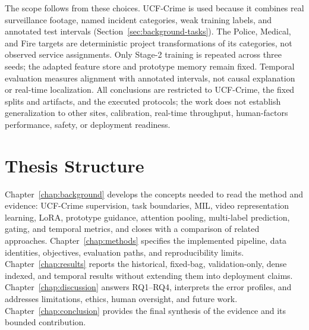 The scope follows from these choices. UCF-Crime is used because it combines
real surveillance footage, named incident categories, weak training labels, and
annotated test intervals (Section~\ref{sec:background-tasks}). The Police,
Medical, and Fire targets are deterministic project transformations of its
categories, not observed service assignments. Only Stage-2 training is repeated
across three seeds; the adapted feature store and prototype memory remain fixed.
Temporal evaluation measures alignment with annotated intervals, not causal
explanation or real-time localization. All conclusions are restricted to
UCF-Crime, the fixed splits and artifacts, and the executed protocols; the work
does not establish generalization to other sites, calibration, real-time
throughput, human-factors performance, safety, or deployment readiness.

\section{Thesis Structure}
\label{sec:introduction-structure}

Chapter~\ref{chap:background} develops the concepts needed to read the method
and evidence: UCF-Crime supervision, task boundaries, MIL, video representation
learning, LoRA, prototype guidance, attention pooling, multi-label prediction,
gating, and temporal metrics, and closes with a comparison of related
approaches. Chapter~\ref{chap:methods}
specifies the implemented pipeline, data identities, objectives, evaluation
paths, and reproducibility limits. Chapter~\ref{chap:results} reports the
historical, fixed-bag, validation-only, dense indexed, and temporal results
without extending them into deployment claims. Chapter~\ref{chap:discussion}
answers RQ1--RQ4, interprets the error profiles, and addresses limitations,
ethics, human oversight, and future work. Chapter~\ref{chap:conclusion}
provides the final synthesis of the evidence and its bounded contribution.
